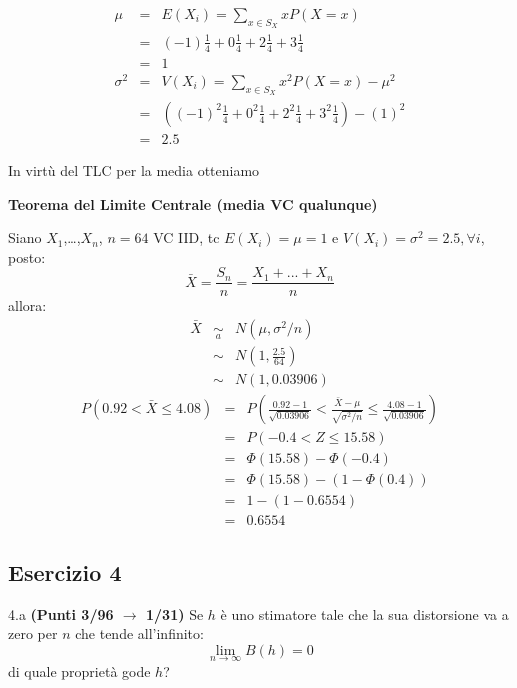 \documentclass[
  11pt,
]{book}
\theoremstyle{mytheoremstyle}
\theoremstyle{mydefstyle}
\newenvironment{sol}
  {
  \begin{tcolorbox}[enhanced,breakable,arc=0.1mm,boxrule=1pt,colback=white,colframe=iblue,
  title=\bf \fontfamily{lmss}\selectfont \hspace{.5 cm} Soluzione,drop fuzzy shadow]

}{
\end{tcolorbox}
  }
\begin{document}
\begin{sol}
\begin{eqnarray*} \mu &=& E(X_i) = \sum_{x\in S_X}x P(X=x)\\ 
 &=& ( -1 ) \frac { 1 }{ 4 }+ 0  \frac { 1 }{ 4 }+ 2  \frac { 1 }{ 4 }+ 3  \frac { 1 }{ 4 } \\ 
            &=& 1 \\ 
 \sigma^2 &=& V(X_i) = \sum_{x\in S_X}x^2 P(X=x)-\mu^2\\ 
 &=&\left( ( -1 ) ^2\frac { 1 }{ 4 }+ 0  ^2\frac { 1 }{ 4 }+ 2  ^2\frac { 1 }{ 4 }+ 3  ^2\frac { 1 }{ 4 } \right)-( 1 )^2\\ 
            &=& 2.5 
\end{eqnarray*}

In virtù del TLC per la media otteniamo

\textbf{Teorema del Limite Centrale (media VC qualunque)}

Siano \(X_1\),\ldots,\(X_n\), \(n=64\) VC IID, tc \(E(X_i)=\mu=1\) e \(V(X_i)=\sigma^2=2.5,\forall i\), posto:
\[
      \bar X=\frac{S_n}n =\frac{X_1 + ... + X_n}n
      \]
allora:\begin{eqnarray*}
  \bar X & \mathop{\sim}\limits_{a}& N(\mu,\sigma^2/n) \\
     &\sim & N\left(1,\frac{2.5}{64}\right) \\
     &\sim & N(1,0.03906)
  \end{eqnarray*}\begin{eqnarray*}
   P( 0.92 < \bar X \leq  4.08 ) &=& P\left( \frac { 0.92  -  1 }{\sqrt{ 0.03906 }} < \frac { \bar X  -  \mu }{ \sqrt{\sigma^2/n} } \leq \frac { 4.08  -  1 }{\sqrt{ 0.03906 }}\right)  \\
              &=& P\left(  -0.4  < Z \leq  15.58 \right) \\
              &=& \Phi( 15.58 )-\Phi( -0.4 )\\
              &=&  \Phi( 15.58 )-(1-\Phi( 0.4 )) \\ &=&  1 -(1- 0.6554 ) \\ 
              &=&  0.6554 
   \end{eqnarray*}

\end{sol}

\subsection{Esercizio 4}\label{esercizio-4-6}

4.a \textbf{(Punti 3/96 \(\rightarrow\) 1/31)} Se \(h\) è uno stimatore tale che la sua distorsione va a zero per \(n\) che tende all'infinito:
\[
\lim_{n\to \infty}B(h)=0
\]
di quale proprietà gode \(h\)?
\end{document}
